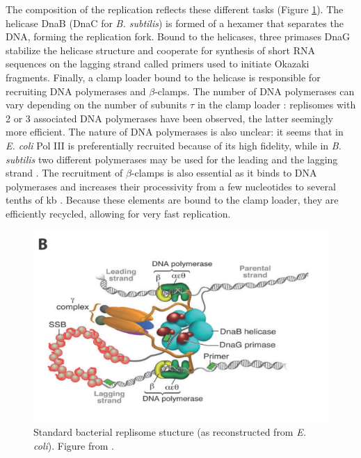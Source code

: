 The composition of the replication reflects these different tasks (Figure \ref{fig:replisome}). The helicase DnaB (DnaC for \textit{B. subtilis}) is formed of a hexamer that separates the DNA, forming the replication fork. Bound to the helicases, three primases DnaG stabilize the helicase structure and cooperate for synthesis of short RNA sequences on the lagging strand called primers used to initiate Okazaki fragments. Finally, a clamp loader bound to the helicase is responsible for recruiting DNA polymerases and $\beta$-clamps. The number of DNA polymerases can vary depending on the number of subunits $\tau$ in the clamp loader \citep{reyes-lamothe_chromosome_2012,stratmann_dna_2014}: replisomes with 2 or 3 associated DNA polymerases have been observed, the latter seemingly more efficient. The nature of DNA polymerases is also unclear: it seems that in \textit{E. coli} Pol III is preferentially recruited because of its high fidelity, while in \textit{B. subtilis} two different polymerases may be used for the leading and the lagging strand \citep{reyes-lamothe_chromosome_2012,stratmann_dna_2014}. The recruitment of $\beta$-clamps is also essential as it binds to DNA polymerases and increases their processivity from a few nucleotides to several tenths of kb \citep{reyes-lamothe_chromosome_2012}. Because these elements are bound to the clamp loader, they are efficiently recycled, allowing for very fast replication.
\begin{figure}[!ht]
	\centering
	\includegraphics[width=0.6\linewidth]{figure/replisome}
	\caption{Standard bacterial replisome stucture (as reconstructed from \textit{E. coli}). Figure from \citet{stratmann_dna_2014}.}
	\label{fig:replisome}
\end{figure}

